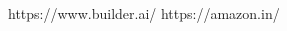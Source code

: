 \documentclass[11pt]{report}
\begin{document}
 

   
%
\begin{thebibliography}{999}

 https://www.builder.ai/
 https://amazon.in/

\end{thebibliography}
\end{document}

